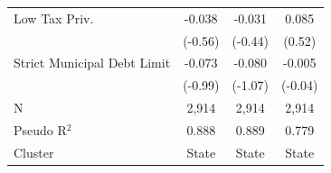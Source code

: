 \begin{tabular*}{\textwidth}{@{\extracolsep{\fill}}lccc}
   Low Tax Priv.               & -0.038            & -0.031                & 0.085\\   
                               & (-0.56)          & (-0.44)              & (0.52)\\   
   Strict Municipal Debt Limit & -0.073            & -0.080                & -0.005\\   
                               & (-0.99)          & (-1.07)              & (-0.04)\\   
   \hline
   N                & 2,914             & 2,914                 & 2,914\\  
   Pseudo R$^2$                & 0.888             & 0.889                 & 0.779\\  
   Cluster              & State & State & State\\  
   \bottomrule
\end{tabular*}
\par\endgroup
